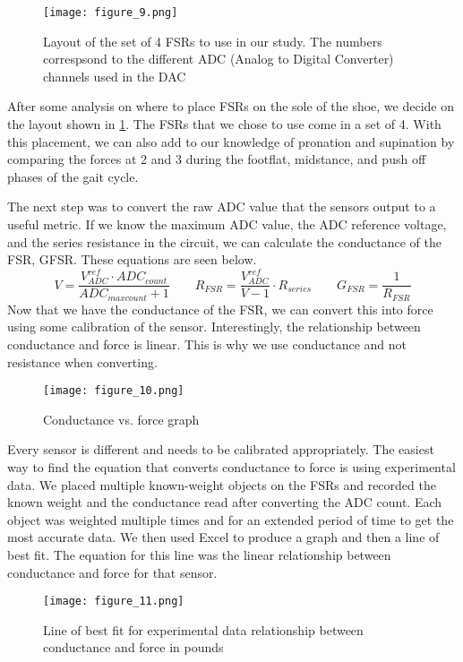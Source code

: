 \begin{figure}
  \centering
  \texttt{[image: figure\_9.png]}
  \caption[FSR layout]{Layout of the set of 4 FSRs to use in our study. The numbers correspsond to the different ADC (Analog to Digital Converter) channels used in the DAC}
  \label{fig:x fsr layout}
\end{figure}
After some analysis on where to place FSRs on the sole of the shoe, we decide on the layout shown in \ref{fig:x fsr layout}.
The FSRs that we chose to use come in a set of 4.
With this placement, we can also add to our knowledge of pronation and supination by comparing the forces at 2 and 3 during the footflat, midstance, and push off phases of the gait cycle.\par
The next step was to convert the raw ADC value that the sensors output to a useful metric.
If we know the maximum ADC value, the ADC reference voltage, and the series resistance in the circuit, we can calculate the conductance of the FSR, GFSR.
These equations are seen below.
$$V=\frac{V^{ref}_{ADC}\cdot ADC_{count}}{ADC_{max count}+1}\qquad R_{FSR}=\frac{V^{ref}_{ADC}}{V-1}\cdot R_{series}\qquad G_{FSR}=\frac{1}{R_{FSR}}$$
Now that we have the conductance of the FSR, we can convert this into force using some calibration of the sensor.
Interestingly, the relationship between conductance and force is linear.
This is why we use conductance and not resistance when converting.\par
\begin{figure}
  \centering
  \texttt{[image: figure\_10.png]}
  \caption[Conductance vs. force]{Conductance vs. force graph \parencite{tekscan-convert}}
  \label{fig:x cond. vs force}
\end{figure}
Every sensor is different and needs to be calibrated appropriately.
The easiest way to find the equation that converts conductance to force is using experimental data.
We placed multiple known-weight objects on the FSRs and recorded the known weight and the conductance read after converting the ADC count.
Each object was weighted multiple times and for an extended period of time to get the most accurate data.
We then used Excel to produce a graph and then a line of best fit.
The equation for this line was the linear relationship between conductance and force for that sensor.\par
\begin{figure}
  \centering
  \texttt{[image: figure\_11.png]}
  \caption[Best fit for conductance vs. force]{Line of best fit for experimental data relationship between conductance and force in pounds}
  \label{fig:x best fit}
\end{figure}
